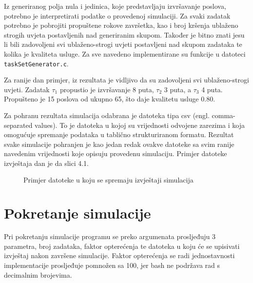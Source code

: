 \documentclass[../zavrsni.tex]{subfiles}
\begin{document}
Iz generiranog polja nula i jedinica, koje predstavljaju izvršavanje poslova, potrebno je interpretirati podatke o provedenoj simulaciji.
Za svaki zadatak potrebno je pobrojiti propuštene rokove završetka, kao i broj kršenja ublaženo strogih uvjeta postavljenih nad generiranim skupom.
Također je bitno znati jesu li bili zadovoljeni svi ublaženo-strogi uvjeti 
postavljeni nad skupom zadataka te kolika je kvaliteta usluge. Za sve navedeno implementirane su funkcije u datoteci \texttt{taskSetGenerator.c}.

Za ranije dan primjer, iz rezultata je vidljivo da su zadovoljeni svi ublaženo-strogi uvjeti. Zadatak $\tau_1$ 
propustio je izvršavanje 8 puta, $\tau_2$ 3 puta, a $\tau_3$ 4 puta. Propušteno je 15 poslova od ukupno 65, što
daje kvalitetu usluge 0.80. 

Za pohranu rezultata simulacija odabrana je datoteka tipa csv (engl. comma-separated values). To je datoteka u kojoj su vrijednosti odvojene zarezima 
i koja omogućuje spremanje podataka u tablično strukturiranom formatu. Rezultat svake simulacije pohranjen je kao jedan redak ovakve datoteke sa svim ranije 
navedenim vrijednosti koje opisuju provedenu simulaciju. Primjer datoteke izvještaja dan je da slici 4.1.

\begin{figure}[!htb]
    \caption{\label{fig:my-label} Primjer datoteke u koju se spremaju izvještaji simulacija}
  \end{figure}

\section{Pokretanje simulacije}

Pri pokretanju simulacije programu se preko argumenata prosljeđuju 3 parametra, broj zadataka, 
faktor opterećenja te datoteka u koju će se upisivati izvještaj nakon završene simulacije.
Faktor opterećenja se radi jednostavnosti implementacije prosljeđuje pomnožen sa 100, jer bash ne podržava rad s decimalnim brojevima.
\end{document}
